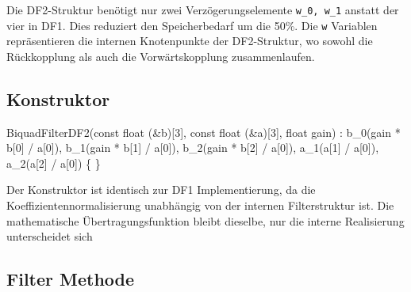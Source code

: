 \documentclass[
  ngerman,
  letterpaper,
  DIV=11]{scrreprt}
\newenvironment{Shaded}{\begin{snugshade}}{\end{snugshade}}
\newcommand{\AttributeTok}[1]{\textcolor[rgb]{0.40,0.45,0.13}{#1}}
\newcommand{\DataTypeTok}[1]{\textcolor[rgb]{0.68,0.00,0.00}{#1}}
\newcommand{\DecValTok}[1]{\textcolor[rgb]{0.68,0.00,0.00}{#1}}
\newcommand{\NormalTok}[1]{\textcolor[rgb]{0.00,0.23,0.31}{#1}}
\newcommand{\OperatorTok}[1]{\textcolor[rgb]{0.37,0.37,0.37}{#1}}
\begin{document}
Die DF2-Struktur benötigt nur zwei Verzögerungselemente
\texttt{w\_0,\ w\_1} anstatt der vier in DF1. Dies reduziert den
Speicherbedarf um die 50\%. Die \texttt{w} Variablen repräsentieren die
internen Knotenpunkte der DF2-Struktur, wo sowohl die Rückkopplung als
auch die Vorwärtskopplung zusammenlaufen.

\subsection{Konstruktor}\label{konstruktor-1}

\begin{Shaded}
\begin{Highlighting}[]
\NormalTok{BiquadFilterDF2}\OperatorTok{(}\AttributeTok{const} \DataTypeTok{float} \OperatorTok{(\&}\NormalTok{b}\OperatorTok{)[}\DecValTok{3}\OperatorTok{],} \AttributeTok{const} \DataTypeTok{float} \OperatorTok{(\&}\NormalTok{a}\OperatorTok{)[}\DecValTok{3}\OperatorTok{],} \DataTypeTok{float}\NormalTok{ gain}\OperatorTok{)}  
    \OperatorTok{:}\NormalTok{ b\_0}\OperatorTok{(}\NormalTok{gain }\OperatorTok{*}\NormalTok{ b}\OperatorTok{[}\DecValTok{0}\OperatorTok{]} \OperatorTok{/}\NormalTok{ a}\OperatorTok{[}\DecValTok{0}\OperatorTok{]),}
\NormalTok{      b\_1}\OperatorTok{(}\NormalTok{gain }\OperatorTok{*}\NormalTok{ b}\OperatorTok{[}\DecValTok{1}\OperatorTok{]} \OperatorTok{/}\NormalTok{ a}\OperatorTok{[}\DecValTok{0}\OperatorTok{]),}
\NormalTok{      b\_2}\OperatorTok{(}\NormalTok{gain }\OperatorTok{*}\NormalTok{ b}\OperatorTok{[}\DecValTok{2}\OperatorTok{]} \OperatorTok{/}\NormalTok{ a}\OperatorTok{[}\DecValTok{0}\OperatorTok{]),}
\NormalTok{      a\_1}\OperatorTok{(}\NormalTok{a}\OperatorTok{[}\DecValTok{1}\OperatorTok{]} \OperatorTok{/}\NormalTok{ a}\OperatorTok{[}\DecValTok{0}\OperatorTok{]),}
\NormalTok{      a\_2}\OperatorTok{(}\NormalTok{a}\OperatorTok{[}\DecValTok{2}\OperatorTok{]} \OperatorTok{/}\NormalTok{ a}\OperatorTok{[}\DecValTok{0}\OperatorTok{])} 
\OperatorTok{\{}
\OperatorTok{\}}
\end{Highlighting}
\end{Shaded}

Der Konstruktor ist identisch zur DF1 Implementierung, da die
Koeffizientennormalisierung unabhängig von der internen Filterstruktur
ist. Die mathematische Übertragungsfunktion bleibt dieselbe, nur die
interne Realisierung unterscheidet sich

\subsection{Filter Methode}\label{filter-methode-1}
\end{document}
